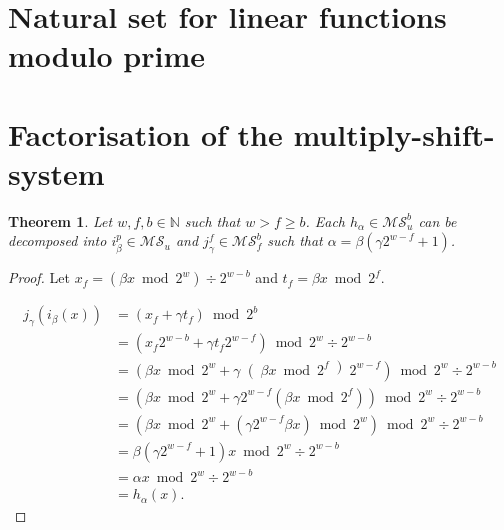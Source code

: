 \documentclass{article}
\newtheorem{theorem}{Theorem}
\begin{document}
\section{Natural set for linear functions modulo prime}

\section{Factorisation of the multiply-shift-system}

\begin{theorem}
Let $w, f, b \in \mathbb{N}$ such that $w > f \geq b$.
Each $h_\alpha \in \mathcal{MS}_{u}^{b}$ can be decomposed into $i_\beta^{p} \in \mathcal{MS}_{u}$ and $j_\gamma^{f} \in \mathcal{MS}_{f}^{b}$ such that $\alpha = \beta (\gamma 2 ^ {w - f} + 1)$.
\end{theorem}
\begin{proof}
Let $x_f = (\beta x \bmod 2^w) \div 2^{w - b}$ and $t_f = \beta x \bmod 2^f$.

\begin{align*}
j_\gamma(i_\beta(x)) & = \left(x_f + \gamma t_f\right) \bmod 2^b \\
	& = \left(x_f 2^{w-b} + \gamma t_f 2^{w-f}\right) \bmod 2^w \div 2^{w-b} \\
	& = \left(\beta x \bmod 2^w + \gamma \right(\beta x \bmod 2^f\left) 2^{w-f}\right) \bmod 2^w \div 2^{w-b} \\
	& = \left(\beta x \bmod 2^w + \gamma 2^{w-f} \left(\beta x \bmod 2^f\right)\right) \bmod 2^w \div 2^{w-b} \\
	& = \left(\beta x \bmod 2^w + \left(\gamma 2^{w-f}\beta x\right) \bmod 2^w\right) \bmod 2^w \div 2^{w-b} \\
	& = \beta \left(\gamma 2^{w - f} + 1\right) x \bmod 2^w \div 2^{w - b} \\
	& = \alpha x \bmod 2^w \div 2^{w - b} \\
	& = h_\alpha(x).
\end{align*}
\end{proof}



\end{document}
